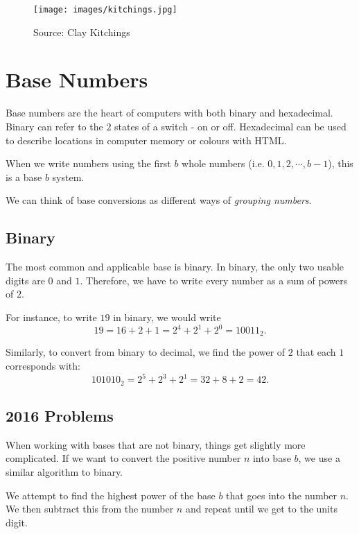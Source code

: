 \begin{figure}[H]
	\centering\texttt{[image: images/kitchings.jpg]}
	\caption{Source:  Clay Kitchings \cite{div:1}}
\end{figure}

\section{Base Numbers}

Base numbers are the heart of computers with both binary and hexadecimal. Binary can refer to the $2$ states of a switch - on or off. Hexadecimal can be used to describe locations in computer memory or colours with HTML.  

\begin{defi} When we write numbers using the first $b$ whole numbers (i.e. $0, 1, 2, \cdots, b-1$), this is a base $b$ system.  \cite{aops:1} \end{defi}

We can think of base conversions as different ways of \textit{grouping numbers}.
\clearpage

\subsection{Binary}

The most common and applicable base is binary. In binary, the only two usable digits are $0$ and $1$. Therefore, we have to write every number as a sum of powers of $2$. 

For instance, to write $19$ in binary, we would write $$19=16+2+1=2^4+2^1+2^0=10011_2.$$  

Similarly, to convert from binary to decimal, we find the power of $2$ that each $1$ corresponds with: $$101010_2=2^5+2^3+2^1=32+8+2=42.$$  

\subsection*{2016 Problems}

When working with bases that are not binary, things get slightly more complicated. If we want to convert the positive number $n$ into base $b$, we use a similar algorithm to binary.  

We attempt to find the highest power of the base $b$ that goes into the number $n$. We then subtract this from the number $n$ and repeat until we get to the units digit. 


